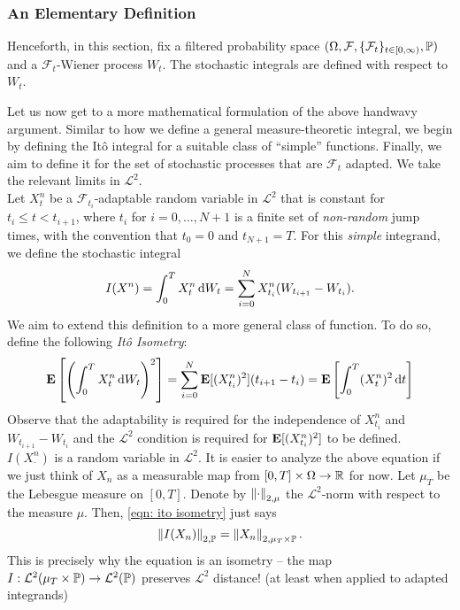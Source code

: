 \subsubsection{An Elementary Definition}

Henceforth, in this section, fix a filtered probability space $(\Omega,\mathcal{F},\{\mathcal{F}_t\}_{t\in[0,\infty)},\mathbb{P})$ and a $\mathcal{F}_t$-Wiener process $W_t$. The stochastic integrals are defined with respect to $W_t$.

Let us now get to a more mathematical formulation of the above handwavy argument. Similar to how we define a general measure-theoretic integral, we begin by defining the It\^{o} integral for a suitable class of ``simple'' functions. Finally, we aim to define it for the set of stochastic processes that are $\mathcal{F}_t$ adapted. We take the relevant limits in $\mathcal{L}^2$.\\

Let $X_t^n$ be a $\mathcal{F}_{t_i}$-adaptable random variable in $\mathcal{L}^2$ that is constant for $t_i \leq t < t_{i+1}$, where $t_i$ for $i=0,\ldots,N+1$ is a finite set of \textit{non-random} jump times, with the convention that $t_0 = 0$ and $t_{N+1} = T$. For this \textit{simple} integrand, we define the stochastic integral
\[ I(X^n) = \int_0^T X_t^n \operatorname{d}\!{W_t} = \sum_{i=0}^N X_{t_i}^n (W_{t_{i+1}} - W_{t_i}). \]
We aim to extend this definition to a more general class of function. To do so, define the following \textit{It\^{o} Isometry}:
\begin{equation}
	\label{eqn: ito isometry}
	\textbf{E}\left[\left(\int_0^T X_t^n \operatorname{d}\!{W}_t\right)^2\right] = \sum_{i=0}^N \textbf{E}[(X_{t_i}^n)^2] (t_{i+1} - t_i) = \textbf{E}\left[\int_0^T (X_t^n)^2 \operatorname{d}\!{t} \right]
\end{equation}
Observe that the adaptability is required for the independence of $X_{t_i}^n$ and $W_{t_{i+1}} - W_{t_i}$ and the $\mathcal{L}^2$ condition is required for $\textbf{E}[(X_{t_i}^n)^2]$ to be defined.\\
$I(X^n_\cdot)$ is a random variable in $\mathcal{L}^2$. It is easier to analyze the above equation if we just think of $X_n$ as a measurable map from $[0,T]\times\Omega\to\mathbb{R}$ for now. Let $\mu_T$ be the Lebesgue measure on $[0,T]$. Denote by $\left\lVert\cdot\right\rVert_{2,\mu}$ the $\mathcal{L}^2$-norm with respect to the measure $\mu$. Then, \eqref{eqn: ito isometry} just says
\begin{equation}
	\label{eqn: ito isometry 2}
	\left\lVert I(X_n)\right\rVert_{2,\mathbb{P}} = \left\lVert X_n\right\rVert_{2,\mu_T\times\mathbb{P}}.
\end{equation}
This is precisely why the equation is an isometry -- the map $I : \mathcal{L}^2(\mu_T\times\mathbb{P}) \to \mathcal{L}^2(\mathbb{P})$ preserves $\mathcal{L}^2$ distance! (at least when applied to adapted integrands)\\

